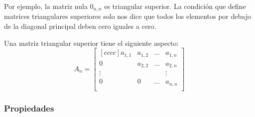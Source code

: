 \documentclass[12pt, fleqn]{report}                             %
\theoremstyle{break}                                            %
\begin{document}
                Por ejemplo, la matriz nula $0_{n,n}$ es triangular superior. La condición que define
                matrices triangulares superiores solo nos dice que todos los elementos por debajo de la
                diagonal principal deben cero iguales a cero.

                Una matriz triangular superior tiene el siguiente aspecto:
                \begin{equation*}
                    A_n =
                    \begin{bmatrix}[cccc]
                        a_{1,1} & a_{1, 2}  & \dots & a_{1, n}  \\
                        0       & a_{2,2}   & \dots & a_{2, n}  \\
                        \vdots  &           &       & \vdots    \\
                        0       & 0         & \dots & a_{n,n}   \\
                    \end{bmatrix}
                \end{equation*}

                \clearpage
                \subsubsection{Propiedades}
\end{document}
